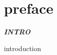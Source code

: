 
\SkipTocEntry\chapter*{preface}
\addtocounter{section}{1}
\begin{fullwidth}

{\itshape\bfseries INTRO
}

introduction

\clearpage
\end{fullwidth}
